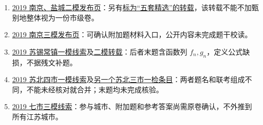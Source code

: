 \documentclass[UTF8]{ctexart}
\begin{document}
\begin{enumerate}
\item \href{https://m.koolearn.com/gaokao/20190321/1211493.html}{2019 南京、盐城二模发布页}：另有\href{https://max.book118.com/html/2019/0419/8102132114002017.shtm}{标为“五套精选”的转载}，该转载不能不加甄别地整体视为一份市级卷。
\item \href{https://app.gaokaozhitongche.com/news/h/0O7gr6OA}{2019 南京三模发布页}：可确认附加题材料入口，公开内容未完成题干校读。
\item \href{https://m.koolearn.com/news/20190319/1170460.html}{2019 苏锡常镇一模线索}及\href{https://www.renrendoc.com/p-83313379.html}{二模转载}：后者末题含函数列 $f_n,g_n$，定义公式缺损，不据残文补题。
\item \href{https://max.book118.com/html/2019/0419/7121015136002021.shtm}{2019 苏北四市一模线索}及\href{https://max.book118.com/html/2023/1006/7140025105005164.shtm}{另一个苏北三市一检条目}：两者题名和联考组成不同，不能未经核对就合并；末题均未完成核验。
\item \href{https://max.book118.com/html/2019/0630/8101117122002032.shtm}{2019 七市三模线索}：参与城市、附加题和参考答案尚需原卷确认，不外推到所有江苏城市。
\end{enumerate}
\end{document}
